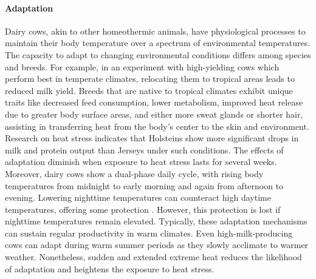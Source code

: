 \paragraph{Adaptation}
Dairy cows, akin to other homeothermic animals, have physiological processes to maintain their body temperature over a spectrum of environmental temperatures. The capacity to adapt to changing environmental conditions differs among species and breeds. For example, in an experiment with high-yielding cows which perform best in temperate climates, relocating them to tropical areas leads to reduced milk yield. Breeds that are native to tropical climates exhibit unique traits like decreased feed consumption, lower metabolism, improved heat release due to greater body surface areas, and either more sweat glands or shorter hair, assisting in transferring heat from the body's center to the skin and environment. Research on heat stress indicates that Holsteins show more significant drops in milk and protein output than Jerseys under such conditions. The effects of adaptation diminish when exposure to heat stress lasts for several weeks. Moreover, dairy cows show a dual-phase daily cycle, with rising body temperatures from midnight to early morning and again from afternoon to evening. Lowering nighttime temperatures can counteract high daytime temperatures, offering some protection \citep{araki_diurnal_1987}. However, this protection is lost if nighttime temperatures remain elevated. Typically, these adaptation mechanisms can sustain regular productivity in warm climates. Even high-milk-producing cows can adapt during warm summer periods as they slowly acclimate to warmer weather. Nonetheless, sudden and extended extreme heat reduces the likelihood of adaptation and heightens the exposure to heat stress\citep{vroege_effects_2023}. 


